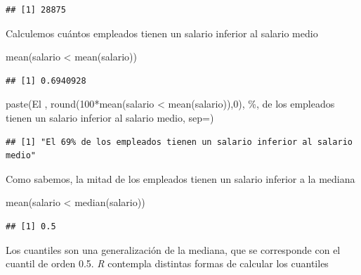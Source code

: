 \documentclass[
]{book}
\newenvironment{Shaded}{\begin{snugshade}}{\end{snugshade}}
\newcommand{\AttributeTok}[1]{\textcolor[rgb]{0.77,0.63,0.00}{#1}}
\newcommand{\DecValTok}[1]{\textcolor[rgb]{0.00,0.00,0.81}{#1}}
\newcommand{\FunctionTok}[1]{\textcolor[rgb]{0.00,0.00,0.00}{#1}}
\newcommand{\NormalTok}[1]{#1}
\newcommand{\SpecialCharTok}[1]{\textcolor[rgb]{0.00,0.00,0.00}{#1}}
\newcommand{\StringTok}[1]{\textcolor[rgb]{0.31,0.60,0.02}{#1}}
\theoremstyle{break}
\theoremstyle{nonumberplain}
\begin{document}
\begin{verbatim}
## [1] 28875
\end{verbatim}

Calculemos cuántos empleados tienen un salario inferior al salario medio

\begin{Shaded}
\begin{Highlighting}[]
\FunctionTok{mean}\NormalTok{(salario }\SpecialCharTok{\textless{}} \FunctionTok{mean}\NormalTok{(salario))}
\end{Highlighting}
\end{Shaded}

\begin{verbatim}
## [1] 0.6940928
\end{verbatim}

\begin{Shaded}
\begin{Highlighting}[]
\FunctionTok{paste}\NormalTok{(}\StringTok{\textquotesingle{}El \textquotesingle{}}\NormalTok{, }\FunctionTok{round}\NormalTok{(}\DecValTok{100}\SpecialCharTok{*}\FunctionTok{mean}\NormalTok{(salario }\SpecialCharTok{\textless{}} \FunctionTok{mean}\NormalTok{(salario)),}\DecValTok{0}\NormalTok{), }\StringTok{\textquotesingle{}\%\textquotesingle{}}\NormalTok{,}
      \StringTok{\textquotesingle{} de los empleados tienen un salario inferior al salario medio\textquotesingle{}}\NormalTok{, }\AttributeTok{sep=}\StringTok{\textquotesingle{}\textquotesingle{}}\NormalTok{)}
\end{Highlighting}
\end{Shaded}

\begin{verbatim}
## [1] "El 69% de los empleados tienen un salario inferior al salario medio"
\end{verbatim}

Como sabemos, la mitad de los empleados tienen un salario inferior a la mediana

\begin{Shaded}
\begin{Highlighting}[]
\FunctionTok{mean}\NormalTok{(salario }\SpecialCharTok{\textless{}} \FunctionTok{median}\NormalTok{(salario))}
\end{Highlighting}
\end{Shaded}

\begin{verbatim}
## [1] 0.5
\end{verbatim}

Los cuantiles son una generalización de la mediana, que se corresponde con el
cuantil de orden 0.5. \emph{R} contempla distintas formas
de calcular los cuantiles
\end{document}
